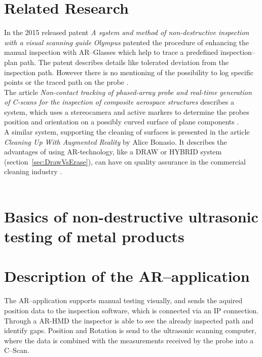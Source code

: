 \documentclass{VRARWorkshop}
\begin{document}
\section{Related Research}
In the 2015 released patent \textit{A system and method of non-destructive inspection with a visual scanning guide} \textit{Olympus} patented the procedure of enhancing the manual inspection with AR--Glasses which help to trace a predefined inspection--plan path.
The patent describes details like tolerated deviation from the inspection path.
However there is no mentioning of the possibility to log specific points or the traced path on the probe \cite{ARPat15}.\\

The article \textit{Non-contact tracking of phased-array probe and real-time generation of C-scans for the inspection of composite aerospace structures} describes a system, which uses a stereocamera and active markers to determine the probes position and orientation on a possibly curved surface of plane components \cite{walter_non-contact_2007}.\\

A similar system, supporting the cleaning of surfaces is presented in the article \textit{Cleaning Up With Augmented Reality} by Alice Bonasio.
It describes the advantages of using AR-technology, like a DRAW or HYBRID system (section~\ref{sec:DrawVsErase}), can have on quality assurance in the commercial cleaning industry \cite{ARClean}.\\

\cite{fadzil_design_2015}\\

\section{Basics of non-destructive ultrasonic testing of metal products}
\cite{deutsch_zfp_2010}
\cite{moles_introduction_2004}
\cite{olympus_Grundlagen}

\section{Description of the AR--application}
The AR--application supports manual testing visually, and sends the aquired position data to the inspection software, which is connected via an IP connection.
Through a AR-HMD the inspector is able to see the already inspected path and identify gaps.
Position and Rotation is send to the ultrasonic scanning computer, where the data is combined with the measurements received by the probe into a C--Scan.
\end{document}
